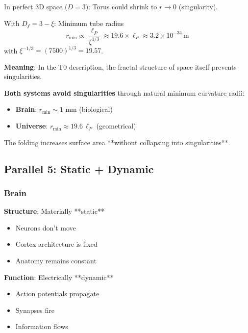 	In perfect 3D space ($D=3$): Torus could shrink to $r \to 0$ (singularity).

	With $D_f = 3-\xi$: Minimum tube radius
	\begin{equation}
		r_{\min} \propto \frac{\ell_P}{\xi^{1/3}} \approx 19.6 \times \ell_P \approx 3.2 \times 10^{-34}\,\text{m}
	\end{equation}
	with $\xi^{-1/3} = (7500)^{1/3} = 19.57$.

	\textbf{Meaning}: In the T0 description, the fractal structure of space itself prevents singularities.

	\begin{keyresult}
		\textbf{Both systems avoid singularities} through natural minimum curvature radii:

		\begin{itemize}
			\item \textbf{Brain}: $r_{\min} \sim 1$ mm (biological)
			\item \textbf{Universe}: $r_{\min} \approx 19.6\, \ell_P$ (geometrical)
		\end{itemize}

		The folding increases surface area **without collapsing into singularities**.
	\end{keyresult}

	\subsection{Parallel 5: Static + Dynamic}

	\subsubsection{Brain}

	\textbf{Structure}: Materially **static**
	\begin{itemize}
		\item Neurons don't move
		\item Cortex architecture is fixed
		\item Anatomy remains constant
	\end{itemize}

	\textbf{Function}: Electrically **dynamic**
	\begin{itemize}
		\item Action potentials propagate
		\item Synapses fire
		\item Information flows
	\end{itemize}

